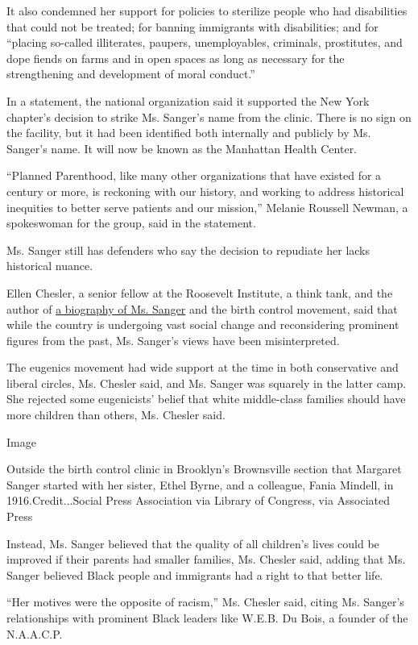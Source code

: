 It also condemned her support for policies to sterilize people who had
disabilities that could not be treated; for banning immigrants with
disabilities; and for ``placing so-called illiterates, paupers,
unemployables, criminals, prostitutes, and dope fiends on farms and in
open spaces as long as necessary for the strengthening and development
of moral conduct.''

In a statement, the national organization said it supported the New York
chapter's decision to strike Ms. Sanger's name from the clinic. There is
no sign on the facility, but it had been identified both internally and
publicly by Ms. Sanger's name. It will now be known as the Manhattan
Health Center.

``Planned Parenthood, like many other organizations that have existed
for a century or more, is reckoning with our history, and working to
address historical inequities to better serve patients and our
mission,'' Melanie Roussell Newman, a spokeswoman for the group, said in
the statement.

Ms. Sanger still has defenders who say the decision to repudiate her
lacks historical nuance.

Ellen Chesler, a senior fellow at the Roosevelt Institute, a think tank,
and the author of
\href{https://www.amazon.com/Woman-Valor-Margaret-Control-Movement/dp/1416540768}{a
biography of Ms. Sanger} and the birth control movement, said that while
the country is undergoing vast social change and reconsidering prominent
figures from the past, Ms. Sanger's views have been misinterpreted.

The eugenics movement had wide support at the time in both conservative
and liberal circles, Ms. Chesler said, and Ms. Sanger was squarely in
the latter camp. She rejected some eugenicists' belief that white
middle-class families should have more children than others, Ms. Chesler
said.

Image

Outside the birth control clinic in Brooklyn's Brownsville section that
Margaret Sanger started with her sister, Ethel Byrne, and a colleague,
Fania Mindell, in 1916.Credit...Social Press Association via Library of
Congress, via Associated Press

Instead, Ms. Sanger believed that the quality of all children's lives
could be improved if their parents had smaller families, Ms. Chesler
said, adding that Ms. Sanger believed Black people and immigrants had a
right to that better life.

``Her motives were the opposite of racism,'' Ms. Chesler said, citing
Ms. Sanger's relationships with prominent Black leaders like W.E.B. Du
Bois, a founder of the N.A.A.C.P.

